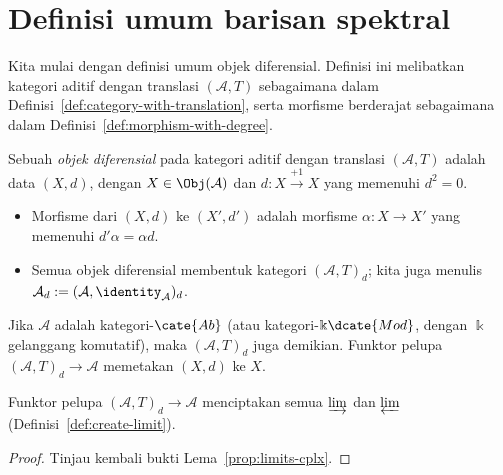 
\section{Definisi umum barisan spektral}\label{sec:spectral-sequence}
\hypertarget{o014.aljabr2.chapter5.general-spectral-sequences}{ }

Kita mulai dengan definisi umum objek diferensial. Definisi ini melibatkan
kategori aditif dengan translasi $(\mathcal{A},T)$ sebagaimana dalam
Definisi~\ref{def:category-with-translation}, serta morfisme berderajat
sebagaimana dalam Definisi~\ref{def:morphism-with-degree}.

\begin{definition}\label{def:differential-object}
	Sebuah \emph{objek diferensial} pada kategori aditif dengan translasi
	$(\mathcal{A},T)$ adalah data $(X,d)$, dengan $X\in\Obj(\mathcal{A})$ dan
	$d:X\xrightarrow{+1}X$ yang memenuhi $d^2=0$.
	\begin{itemize}
		\item Morfisme dari $(X,d)$ ke $(X',d')$ adalah morfisme
		$\alpha:X\to X'$ yang memenuhi $d'\alpha=\alpha d$.
		\item Semua objek diferensial membentuk kategori $(\mathcal{A},T)_d$;
		kita juga menulis
		$\mathcal{A}_d:=(\mathcal{A},\identity_{\mathcal{A}})_d$.
	\end{itemize}
\end{definition}

Jika $\mathcal{A}$ adalah kategori-$\cate{Ab}$ (atau
kategori-$\Bbbk\dcate{Mod}$, dengan $\Bbbk$ gelanggang komutatif), maka
$(\mathcal{A},T)_d$ juga demikian. Funktor pelupa
$(\mathcal{A},T)_d\to\mathcal{A}$ memetakan $(X,d)$ ke $X$.

\begin{proposition}
	Funktor pelupa $(\mathcal{A},T)_d\to\mathcal{A}$ menciptakan semua
	$\varinjlim$ dan $\varprojlim$ (Definisi~\ref{def:create-limit}).
\end{proposition}
\begin{proof}
	Tinjau kembali bukti Lema~\ref{prop:limits-cplx}.
\end{proof}

